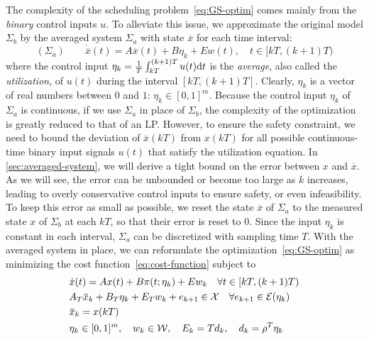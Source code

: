 The complexity of the %
scheduling problem~\eqref{eq:GS-optim} comes mainly from the \emph{binary} control inputs $u$.
To alleviate this issue, we %
approximate the original model $\Sigma_b$ by %
the averaged system $\Sigma_a$ with state $\overbar{x}$ for each time interval:
\begin{equation*}
(\Sigma_a) \qquad \dot{\overbar{x}} (t) = A \overbar{x} (t) + B \eta_k + Ew (t), \quad t \in [kT, (k + 1) T)
 \end{equation*}
where the control input $\eta_k = \frac{1}{T} \int_{kT}^{(k + 1) T} u (t) \mathrm{d} t$ is the \emph{average}, also called the \emph{utilization}, of $u (t)$ during the interval $[kT, (k + 1) T]$.
Clearly, $\eta_k$ is a vector of real numbers between $0$ and $1$: $\eta_k \in [0, 1]^m$.
Because the control input $\eta_k$ of $\Sigma_a$ is continuous, if we use $\Sigma_a$ in place of $\Sigma_b$, the complexity of the optimization is greatly reduced to that of an LP.
However, to ensure the safety constraint, we need to bound the deviation of $\overbar{x} (kT)$ from $x (kT)$ for all possible continuous-time binary input signals $u (t)$ that satisfy the utilization equation.
In \cref{sec:averaged-system}, we will derive a tight bound on the error between $x$ and $\overbar{x}$.
As we will see, the error can be unbounded or become too large as $k$ increases, leading to overly conservative control inputs to ensure safety, or even infeasibility.
To keep this error as small as possible, we reset the state $\overbar{x}$ of $\Sigma_a$ to the measured state $x$ of $\Sigma_b$ at each $kT$, so that their error is reset to $0$.
Since the input $\eta_k$ is constant in each interval, $\Sigma_a$ can be discretized with sampling time $T$.
With the averaged system in place, we can reformulate the optimization~\eqref{eq:GS-optim} as minimizing the cost function~\eqref{eq:cost-function} subject to
\begin{subequations}
  \label{eq:averaged-optim}
  \begin{align}
    & \dot{x} (t) = Ax (t) + B \pi (t ; \eta_k) + Ew_{k} \quad \forall t \in [kT, (k + 1) T) %
\label{eq:averaged-optim:cont}\\
    & A_{T}  \overbar{x}_{k} + B_{T} \eta_k + E_{T} w_{k} + e_{k+1} \in \XSet \quad \forall e_{k+1} \in \ESet (\eta_{k}) \label{eq:averaged-optim:safety}\\
    & \overbar{x}_{k} = x (kT) \label{eq:averaged-optim:reset}\\
    & \eta_{k} \in [0,1]^{m}, \quad w_{k} \in \WSet, \quad E_k = Td_k, \quad d_k = \rho^T \eta_k
  \end{align}
\end{subequations}
